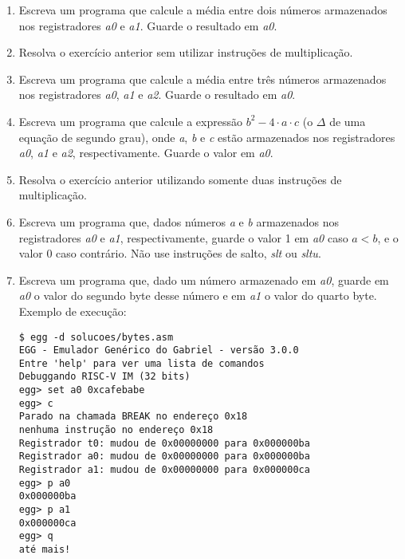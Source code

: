 \documentclass{article}
\begin{document}
\begin{enumerate}
	\item Escreva um programa que calcule a média entre dois números armazenados
	nos registradores \textit{a0} e \textit{a1}. Guarde o resultado em
	\textit{a0}.

	\item Resolva o exercício anterior sem utilizar instruções de multiplicação.

	\item Escreva um programa que calcule a média entre três números armazenados
	nos registradores \textit{a0}, \textit{a1} e \textit{a2}. Guarde o resultado
	em \textit{a0}.

	\item Escreva um programa que calcule a expressão $b^2 - 4 \cdot a \cdot c$ (o
	$\Delta$ de uma equação de segundo grau), onde \textit{a}, \textit{b} e
	\textit{c} estão armazenados nos registradores \textit{a0}, \textit{a1} e
	\textit{a2}, respectivamente. Guarde o valor em \textit{a0}.

	\item Resolva o exercício anterior utilizando somente duas instruções de
	multiplicação.

	\item Escreva um programa que, dados números \textit{a} e \textit{b}
	armazenados nos registradores \textit{a0} e \textit{a1}, respectivamente,
	guarde o valor 1 em \textit{a0} caso $a < b$, e o valor 0 caso contrário. Não
	use instruções de salto, \textit{slt} ou \textit{sltu}.

	\item Escreva um programa que, dado um número armazenado em \textit{a0},
	guarde em \textit{a0} o valor do segundo byte desse número e em \textit{a1} o
	valor do quarto byte. Exemplo de execução:

	\begin{verbatim}
$ egg -d solucoes/bytes.asm
EGG - Emulador Genérico do Gabriel - versão 3.0.0
Entre 'help' para ver uma lista de comandos
Debuggando RISC-V IM (32 bits)
egg> set a0 0xcafebabe
egg> c
Parado na chamada BREAK no endereço 0x18
nenhuma instrução no endereço 0x18
Registrador t0: mudou de 0x00000000 para 0x000000ba
Registrador a0: mudou de 0x00000000 para 0x000000ba
Registrador a1: mudou de 0x00000000 para 0x000000ca
egg> p a0
0x000000ba
egg> p a1
0x000000ca
egg> q
até mais!
	\end{verbatim}


\end{enumerate}
\end{document}

